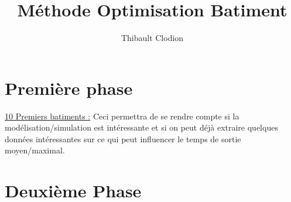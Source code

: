 \documentclass[12pt]{article}
\title{Méthode Optimisation Batiment}
\author{Thibault Clodion}
\begin{document}
\maketitle %

\section{Première phase}

\underline{10 Premiers batiments :}
\newline
\newline Ceci permettra de se rendre compte si la modélisation/simulation
est intéressante et si on peut déjà extraire quelques données intéressantes
sur ce qui peut influencer le temps de sortie moyen/maximal.
\newline 

\section{Deuxième Phase}
\end{document}
